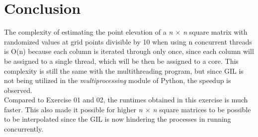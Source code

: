 \documentclass{article}
\begin{document}
\section*{Conclusion}
\hspace{\parindent} The complexity of estimating the point elevation of a \emph{n $\times$ n} square matrix with randomized values at grid points divisible by 10 when using n concurrent threads is O(n) because each column is iterated through only once, since each column will be assigned to a single thread, which will be then be assigned to a core. This complexity is still the same with the multithreading program, but since GIL is not being utilized in the \emph{multiprocessing} module of Python, the speedup is observed.\\
\indent Compared to Exercise 01 and 02, the runtimes obtained in this exercise is much faster. This also made it possible for higher \emph{n $\times$ n} square matrices to be possible to be interpolated since the GIL is now hindering the processes in running concurrently. 


\printbibliography{}


\pagebreak
\end{document}
